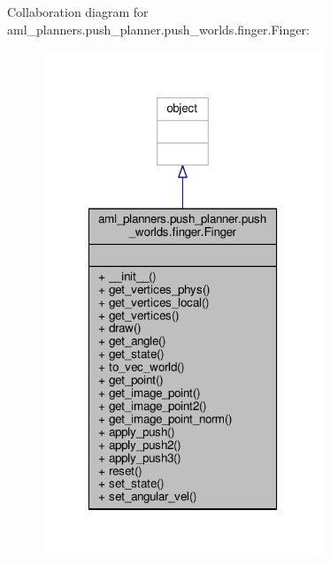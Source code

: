 Collaboration diagram for aml\-\_\-planners.\-push\-\_\-planner.\-push\-\_\-worlds.\-finger.\-Finger\-:\nopagebreak
\begin{figure}[H]
\begin{center}
\leavevmode
\includegraphics[width=238pt]{classaml__planners_1_1push__planner_1_1push__worlds_1_1finger_1_1_finger__coll__graph}
\end{center}
\end{figure}
